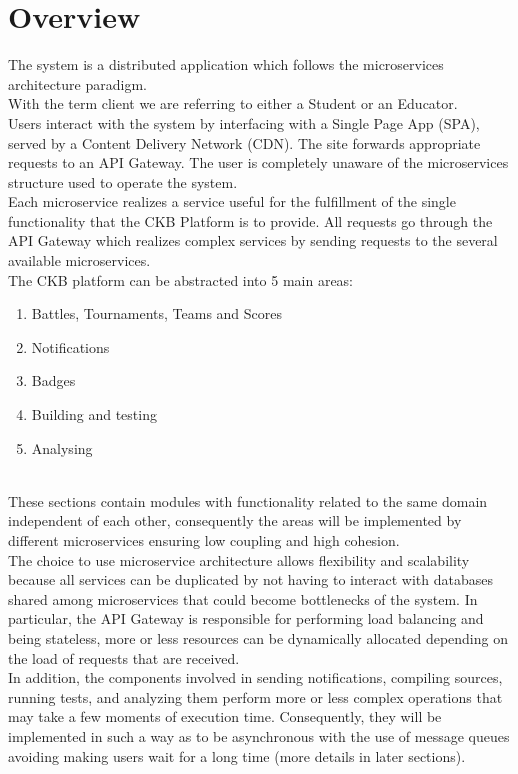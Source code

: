 \section{Overview}
The system is a distributed application which follows the microservices architecture paradigm.\\
With the term client we are referring to either a Student or an Educator.\\
Users interact with the system by interfacing with a Single Page App (SPA), served by a Content Delivery Network (CDN).
The site forwards appropriate requests to an API Gateway.
The user is completely unaware of the microservices structure used to operate the system.\\
Each microservice realizes a service useful for the fulfillment of the single functionality that the CKB Platform is to provide.
All requests go through the API Gateway which realizes complex services by sending requests to the several available microservices.\\
The CKB platform can be abstracted into 5 main areas:
\begin{enumerate}

    \item Battles, Tournaments, Teams and Scores
    \item Notifications
    \item Badges
    \item Building and testing
    \item Analysing

\end{enumerate}

\\

These sections contain modules with functionality related to the same domain independent of each other, consequently the areas will be implemented by different microservices ensuring low coupling and high cohesion.\\
The choice to use microservice architecture allows flexibility and scalability because all services can be duplicated by not having to interact with databases shared among microservices that could become bottlenecks of the system.
In particular, the API Gateway is responsible for performing load balancing and being stateless, more or less resources can be dynamically allocated depending on the load of requests that are received.\\
In addition, the components involved in sending notifications, compiling sources, running tests, and analyzing them perform more or less complex operations that may take a few moments of execution time.
Consequently, they will be implemented in such a way as to be asynchronous with the use of message queues avoiding making users wait for a long time (more details in later sections).


